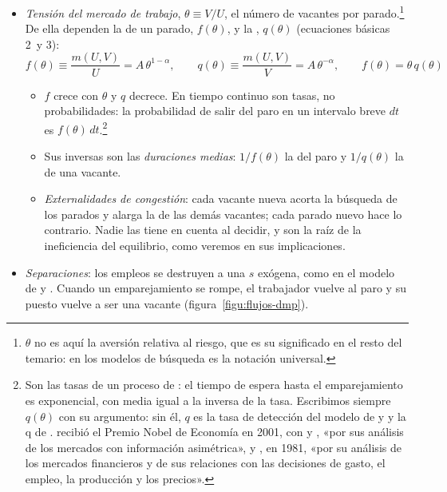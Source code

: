 \documentclass[11pt]{article}
\begin{document}
\begin{itemize}
\begin{itemize}
  \end{itemize}
\item \emph{Tensión del mercado de trabajo}, $\theta\equiv V/U$, el número de vacantes por parado.\footnote{$\theta$ no es aquí la aversión relativa al riesgo, que es su significado en el resto del temario: en los modelos de búsqueda es la notación universal\nocite{Pissarides2000Equilibrium}.} De ella dependen la  de un parado, $f(\theta)$, y la , $q(\theta)$ (ecuaciones básicas 2~y 3):
  \begin{equation}
  f(\theta)\equiv\frac{m(U,V)}{U}=A\,\theta^{1-\alpha},\qquad q(\theta)\equiv\frac{m(U,V)}{V}=A\,\theta^{-\alpha},\qquad f(\theta)=\theta\,q(\theta)\label{eq:tasas-busqueda}
  \end{equation}
  \begin{itemize}
  \item $f$ crece con $\theta$ y $q$ decrece. En tiempo continuo son tasas, no probabilidades: la probabilidad de salir del paro en un intervalo breve $dt$ es $f(\theta)\,dt$.\footnote{Son las tasas de un proceso de : el tiempo de espera hasta el emparejamiento es exponencial, con media igual a la inversa de la tasa. Escribimos siempre $q(\theta)$ con su argumento: sin él, $q$ es la tasa de detección del modelo de  y   y la q de  .  recibió el Premio Nobel de Economía en 2001, con  y , «por sus análisis de los mercados con información asimétrica»\nocite{Nobel2001AkerlofSpenceStiglitz}, y , en 1981, «por su análisis de los mercados financieros y de sus relaciones con las decisiones de gasto, el empleo, la producción y los precios»\nocite{Nobel1981Tobin}.}
  \item Sus inversas son las \emph{duraciones medias}: $1/f(\theta)$ la del paro y $1/q(\theta)$ la de una vacante.
  \item \emph{Externalidades de congestión}: cada vacante nueva acorta la búsqueda de los parados y alarga la de las demás vacantes; cada parado nuevo hace lo contrario. Nadie las tiene en cuenta al decidir, y son la raíz de la ineficiencia del equilibrio, como veremos en sus implicaciones.
  \end{itemize}
\item \emph{Separaciones}: los empleos se destruyen a una  $s$ exógena, como en el modelo de  y  . Cuando un emparejamiento se rompe, el trabajador vuelve al paro y su puesto vuelve a ser una vacante (figura~\ref{figu:flujos-dmp}).
\end{itemize}
\end{document}
